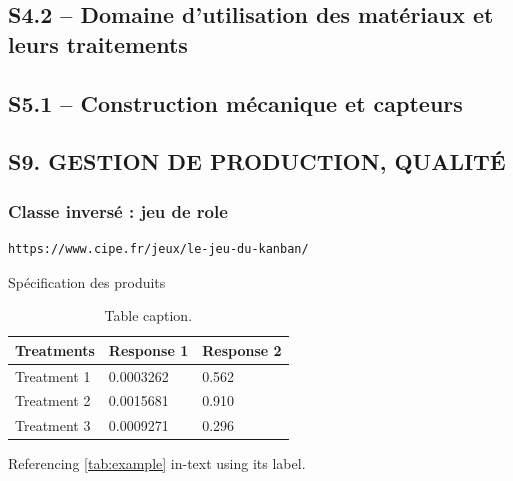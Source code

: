 \documentclass[
	11pt, %
	fleqn, %
	a4paper, %
]{LegrandOrangeBook}
\begin{document}
\subsection{S4.2 – Domaine d’utilisation des matériaux et leurs traitements}
\subsection{S5.1 – Construction mécanique et capteurs}
\subsection{S9. GESTION DE PRODUCTION, QUALITÉ}
\subsubsection{Classe inversé : jeu de role}
\begin{verbatim}
https://www.cipe.fr/jeux/le-jeu-du-kanban/
\end{verbatim}

\begin{corollary}[S6.1]
Spécification des produits
\end{corollary}

\begin{table}[H] %
	\centering %
	\begin{tabular}{L{0.15\textwidth} R{0.15\textwidth} R{0.15\textwidth}} %
		\toprule
		\textbf{Treatments} & \textbf{Response 1} & \textbf{Response 2}\\
		\midrule
		Treatment 1 & 0.0003262 & 0.562 \\
		Treatment 2 & 0.0015681 & 0.910 \\
		Treatment 3 & 0.0009271 & 0.296 \\
		\bottomrule
	\end{tabular}
	\caption{Table caption.}
	\label{tab:example} %
\end{table}

Referencing \autoref{tab:example} in-text using its label.
\end{document}
